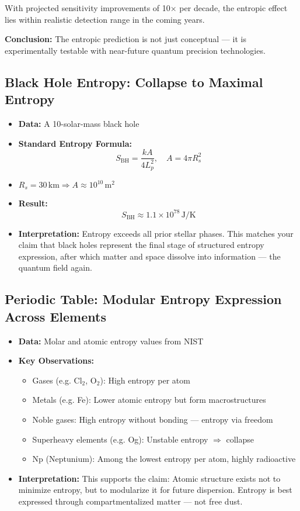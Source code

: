 \documentclass[12pt]{article}
\begin{document}
With projected sensitivity improvements of 10× per decade, the entropic effect lies within realistic detection range in the coming years.

\textbf{Conclusion:} The entropic prediction is not just conceptual — it is experimentally testable with near-future quantum precision technologies.

\subsection{Black Hole Entropy: Collapse to Maximal Entropy}

\begin{itemize}
    \item \textbf{Data:} A 10-solar-mass black hole
    \item \textbf{Standard Entropy Formula:}
    \[
    S_{\text{BH}} = \frac{k A}{4 L_p^2}, \quad A = 4\pi R_s^2
    \]
    \item $R_s = 30 \, \text{km} \Rightarrow A \approx 10^{10} \, \text{m}^2$
    \item \textbf{Result:}
    \[
    S_{\text{BH}} \approx 1.1 \times 10^{78} \, \text{J/K}
    \]
    \item \textbf{Interpretation:} Entropy exceeds all prior stellar phases. This matches your claim that black holes represent the final stage of structured entropy expression, after which matter and space dissolve into information — the quantum field again.
\end{itemize}

\subsection{Periodic Table: Modular Entropy Expression Across Elements}

\begin{itemize}
    \item \textbf{Data:} Molar and atomic entropy values from NIST
    \item \textbf{Key Observations:}
    \begin{itemize}
        \item Gases (e.g. Cl$_2$, O$_2$): High entropy per atom
        \item Metals (e.g. Fe): Lower atomic entropy but form macrostructures
        \item Noble gases: High entropy without bonding — entropy via freedom
        \item Superheavy elements (e.g. Og): Unstable entropy $\Rightarrow$ collapse
        \item Np (Neptunium): Among the lowest entropy per atom, highly radioactive
    \end{itemize}
    \item \textbf{Interpretation:} This supports the claim: Atomic structure exists not to minimize entropy, but to modularize it for future dispersion. Entropy is best expressed through compartmentalized matter — not free dust.
\end{itemize}
\end{document}

